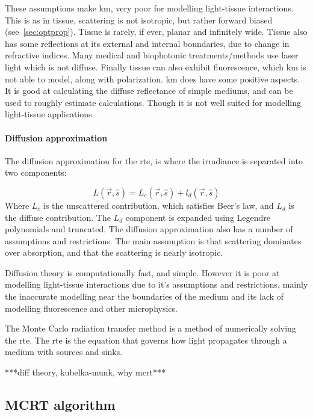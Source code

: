 These assumptions make \gls{km}, very poor for modelling light-tissue interactions. This is as in tissue, scattering is not isotropic, but rather forward biased (see~\cref{sec:optprop}). Tissue is rarely, if ever, planar and infinitely wide. Tissue also has some reflections at its external and internal boundaries, due to change in refractive indices. Many medical and biophotonic treatments/methods use laser light which is not diffuse. Finally tissue can also exhibit fluorescence, which \gls{km} is not able to model, along with polarization. 
\Gls{km} does have some positive aspects. It is good at calculating the diffuse reflectance of simple mediums, and can be used to roughly estimate calculations. Though it is not well suited for modelling light-tissue applications.

\paragraph{Diffusion approximation}
The diffusion approximation for the \gls{rte}, is where the irradiance is separated into two components:

\begin{equation}
	L(\vec{r},\hat{s}) = L_c(\vec{r},\hat{s}) +l_d(\vec{r},\hat{s})
\end{equation}
Where $L_c$ is the unscattered contribution, which satisfies Beer's law, and $L_d$ is the diffuse contribution. The $L_d$ component is expanded using Legendre polynomials and truncated. 
The diffusion approximation also has a number of assumptions and restrictions. The main assumption is that scattering dominates over absorption, and that the scattering is nearly isotropic.

Diffusion theory is computationally fast, and simple. However it is poor at modelling light-tissue interactions due to it's assumptions and restrictions, mainly the inaccurate modelling near the boundaries of the medium and its lack of modelling fluorescence and other microphysics.

The Monte Carlo radiation transfer method is a method of numerically solving the \gls{rte}. The \gls{rte} is the equation that governs how light propagates through a medium with sources and sinks.


***diff theory, kubelka-munk, why mcrt***


\subsection{MCRT algorithm}

